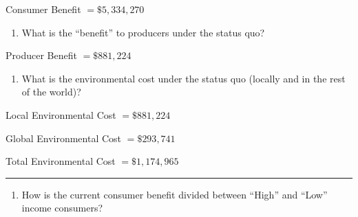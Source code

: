 \documentclass[]{article}
\newenvironment{Shaded}{\begin{snugshade}}{\end{snugshade}}
\newcommand{\CommentTok}[1]{\textcolor[rgb]{0.56,0.35,0.01}{\textit{#1}}}
\newcommand{\DecValTok}[1]{\textcolor[rgb]{0.00,0.00,0.81}{#1}}
\newcommand{\KeywordTok}[1]{\textcolor[rgb]{0.13,0.29,0.53}{\textbf{#1}}}
\newcommand{\NormalTok}[1]{#1}
\newcommand{\OperatorTok}[1]{\textcolor[rgb]{0.81,0.36,0.00}{\textbf{#1}}}
\newcommand{\StringTok}[1]{\textcolor[rgb]{0.31,0.60,0.02}{#1}}
\providecommand{\tightlist}{%
  \setlength{\itemsep}{0pt}\setlength{\parskip}{0pt}}
\begin{document}
Consumer Benefit \(=\$5,334,270\)

\begin{enumerate}
\def\labelenumi{\alph{enumi}.}
\setcounter{enumi}{3}
\tightlist
\item
  What is the ``benefit'' to producers under the status quo?
\end{enumerate}

Producer Benefit \(=\$881,224\)

\begin{enumerate}
\def\labelenumi{\alph{enumi}.}
\setcounter{enumi}{4}
\tightlist
\item
  What is the environmental cost under the status quo (locally and in
  the rest of the world)?
\end{enumerate}

\begin{Shaded}
\end{Shaded}

Local Environmental Cost \(=\$881,224\)

Global Environmental Cost \(=\$293,741\)

Total Environmental Cost \(=\$1,174,965\)

\begin{center}\rule{0.5\linewidth}{0.5pt}\end{center}

\begin{enumerate}
\def\labelenumi{\arabic{enumi}.}
\setcounter{enumi}{1}
\tightlist
\item
  How is the current consumer benefit divided between ``High'' and
  ``Low'' income consumers?
\end{enumerate}
\end{document}
